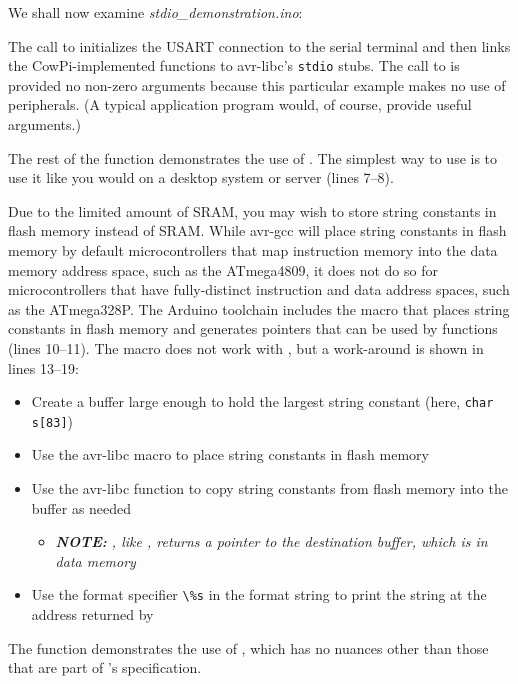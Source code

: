 {    We shall now examine \textit{stdio\_demonstration.ino}:

    

    The call to \hyperlink{function:cowpi_stdio_setup}{} initializes the USART connection to the serial terminal and then links the CowPi-implemented functions to avr-libc's \texttt{stdio} stubs.
    The call to \hyperlink{function:cowpi_setup}{} is provided no non-zero arguments because this particular example makes no use of peripherals.
    (A typical application program would, of course, provide useful arguments.)

    The rest of the  function demonstrates the use of .
    The simplest way to use  is to use it like you would on a desktop system or server (lines 7--8).

    Due to the limited amount of SRAM, you may wish to store string constants in flash memory instead of SRAM.
    While avr-gcc will place string constants in flash memory by default microcontrollers that map instruction memory into the data memory address space, such as the ATmega4809, it does not do so for microcontrollers that have fully-distinct instruction and data address spaces, such as the ATmega328P.
    The Arduino toolchain includes the  macro that places string constants in flash memory and generates pointers that can be used by  functions (lines 10--11).
    The  macro does not work with , but a work-around is shown in lines 13--19:
    \begin{itemize}
        \item Create a buffer large enough to hold the largest string constant (here, \lstinline{char s[83]})
        \item Use the avr-libc  macro to place string constants in flash memory
        \item Use the avr-libc  function to copy string constants from flash memory into the buffer as needed
            \begin{itemize}
                \item \textit{\textbf{NOTE:} , like , returns a pointer to the destination buffer, which is in data memory}
            \end{itemize}
        \item Use the format specifier \lstinline{\%s} in the  format string to print the string at the address returned by 
    \end{itemize}

    The  function demonstrates the use of , which has no nuances other than those that are part of 's specification.
}{}

